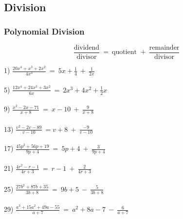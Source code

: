 \documentclass[11pt]{book}
\newcommand{\tmstrong}[1]{\textbf{#1}}
\theoremstyle{definition}  %
\begin{document}
\newpage

\subsection*{Division}
\subsubsection{Polynomial Division}
$$\frac{\text{dividend}}{\text{divisor}}~=~\text{quotient~}+~\frac{\text{remainder}}{\text{divisor}}$$

  1) $\frac{20 x^4 + x^3 + 2 x^2}{4 x^3}~=~5x+\frac{1}{4}~+~\frac{1}{2 x}$\\
~\\
  5) $\frac{12 x^4 + 24 x^3 + 3 x^2}{6 x}~=~2x^3+4x^2+\frac{1}{2}x$\\
~\\
  9) $\frac{x^2 - 2 x - 71}{x + 8}~=~x-10~+~\frac{9}{x + 8}$\\
~\\
  13) $\frac{v^2 - 2 v - 89}{v - 10}~=v+8~+~\frac{-9}{v - 10}$\\
~\\
  17) $\frac{45 p^2 + 56 p + 19}{9 p + 4}~=~5p+4~+~\frac{3}{9 p + 4}$\\
~\\
  21) $\frac{4 r^2 - r - 1}{4 r + 3}~=~r-1~+~\frac{2}{4 r + 3}$\\
~\\
  25) $\frac{27 b^2 + 87 b + 35}{3 b + 8}~=~9b+5~-~\frac{5}{3 b + 8}$\\
~\\
  29) $\frac{a^3 + 15 a^2 + 49 a - 55}{a + 7}~=~a^2+8a-7~-~\frac{6}{a + 7}$\\
\end{document}
